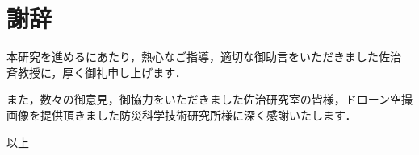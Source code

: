   \chapter*{謝辞}
      本研究を進めるにあたり，熱心なご指導，適切な御助言をいただきました佐治 斉教授に，厚く御礼申し上げます．

      また，数々の御意見，御協力をいただきました佐治研究室の皆様，ドローン空撮画像を提供頂きました防災科学技術研究所様に深く感謝いたします．

    \begin{flushright}
      以上
    \end{flushright}


